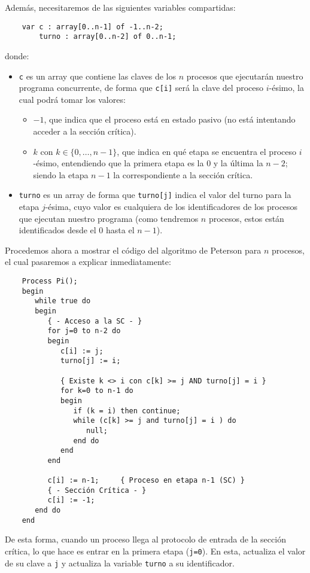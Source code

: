 Además, necesitaremos de las siguientes variables compartidas:
\begin{verbatim}
    var c : array[0..n-1] of -1..n-2;
        turno : array[0..n-2] of 0..n-1;
\end{verbatim}
donde:
\begin{itemize}
    \item \verb|c| es un array que contiene las claves de los $n$ procesos que ejecutarán nuestro programa concurrente, de forma que \verb|c[i]| será la clave del proceso $i$-ésimo, la cual podrá tomar los valores:
        \begin{itemize}
            \item $-1$, que indica que el proceso está en estado pasivo (no está intentando acceder a la sección crítica).
            \item $k$ con $k \in \{0,\ldots,n-1\}$, que indica en qué etapa se encuentra el proceso $i$-ésimo, entendiendo que la primera etapa es la $0$ y la última la $n-2$; siendo la etapa $n-1$ la correspondiente a la sección crítica.
        \end{itemize}
    \item \verb|turno| es un array de forma que \verb|turno[j]| indica el valor del turno para la etapa $j$-ésima, cuyo valor es cualquiera de los identificadores de los procesos que ejecutan nuestro programa (como tendremos $n$ procesos, estos están identificados desde el $0$ hasta el $n-1$).
\end{itemize}
Procedemos ahora a mostrar el código del algoritmo de Peterson para $n$ procesos, el cual pasaremos a explicar inmediatamente:
\begin{verbatim}
    Process Pi();
    begin
       while true do
       begin
          { - Acceso a la SC - }
          for j=0 to n-2 do
          begin
             c[i] := j;
             turno[j] := i;

             { Existe k <> i con c[k] >= j AND turno[j] = i }
             for k=0 to n-1 do
             begin
                if (k = i) then continue;
                while (c[k] >= j and turno[j] = i ) do
                   null;
                end do
             end
          end

          c[i] := n-1;     { Proceso en etapa n-1 (SC) }
          { - Sección Crítica - }
          c[i] := -1;
       end do
    end
\end{verbatim}
De esta forma, cuando un proceso llega al protocolo de entrada de la sección crítica, lo que hace es entrar en la primera etapa (\verb|j=0|). En esta, actualiza el valor de su clave a \verb|j| y actualiza la variable \verb|turno| a su identificador.

